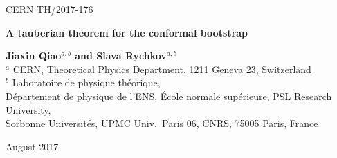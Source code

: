 \documentclass[12pt]{article}
\def\bR {\mathbb{R}}
\numberwithin{equation}{section}
\begin{document}
\vspace*{-.6in} \thispagestyle{empty}
\begin{flushright}
CERN TH/2017-176
\end{flushright}
\vspace{1cm} {\large
\begin{center}
{\bf A tauberian theorem for the conformal bootstrap}
\end{center}}
\vspace{1cm}
\begin{center}
{\bf Jiaxin Qiao$^{a,b}$ and Slava Rychkov$^{a,b}$}\\[2cm] 
{
\small
$^a$  CERN, Theoretical Physics Department, 1211 Geneva 23, Switzerland\\
$^b$ Laboratoire de physique th\'eorique,\\ D\'epartement de physique de l'ENS,
\'Ecole normale sup\'erieure, PSL Research University,\\ 
Sorbonne Universit\'es, UPMC Univ.~Paris 06, CNRS, 75005 Paris, France
\normalsize
}
\end{center}

\vspace{4mm}
\begin{abstract}
For expansions in one-dimensional conformal blocks, we provide a rigorous link between the asymptotics of the spectral density of exchanged primaries and the leading singularity in the crossed channel. Our result has a direct application to systems of ${\rm SL}(2,\bR)$-invariant correlators (also known as 1d CFTs). It also puts on solid ground a part of the lightcone bootstrap analysis of the spectrum of operators of high spin and bounded twist in CFTs in $d>2$.
In addition, a similar argument controls the spectral density asymptotics in large $N$ gauge theories.
\end{abstract}


\vspace{1cm}
\hspace{0.3cm} \noindent August 2017

\newpage

{
\tableofcontents
}


\setlength{\parskip}{0.04in}
\end{document}
